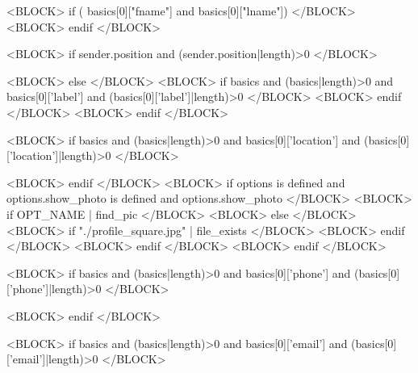 



<BLOCK> if ( basics[0]["fname"] and basics[0]["lname"]) </BLOCK>
<BLOCK> endif </BLOCK>

<BLOCK> if sender.position and (sender.position|length)>0 </BLOCK>

<BLOCK> else </BLOCK>
<BLOCK> if basics and (basics|length)>0 and basics[0]['label'] and (basics[0]['label']|length)>0 </BLOCK>
<BLOCK> endif </BLOCK>
<BLOCK> endif </BLOCK>

<BLOCK> if basics and (basics|length)>0 and basics[0]['location'] and (basics[0]['location']|length)>0 </BLOCK>
\address{<VAR>
  [
    basics[0]['location'][0]['city']       | default(''),
    basics[0]['location'][0]['region']     | default(''),
    basics[0]['location'][0]['postalCode'] | default(''),
    basics[0]['location'][0]['country']    | default('')
  ]
  | reject('equalto','')
  | join(', ')
  | latex_escape
</VAR>}
<BLOCK> endif </BLOCK>
<BLOCK> if options is defined and options.show_photo is defined and options.show_photo </BLOCK>
  <BLOCK> if OPT_NAME | find_pic </BLOCK>
  <BLOCK> else </BLOCK>
    <BLOCK> if "./profile_square.jpg" | file_exists </BLOCK>
    <BLOCK> endif </BLOCK>
  <BLOCK> endif </BLOCK>
<BLOCK> endif </BLOCK>



<BLOCK> if basics and (basics|length)>0 and basics[0]['phone'] and (basics[0]['phone']|length)>0 </BLOCK>


<BLOCK> endif </BLOCK>

<BLOCK> if basics and (basics|length)>0 and basics[0]['email'] and (basics[0]['email']|length)>0 </BLOCK>

